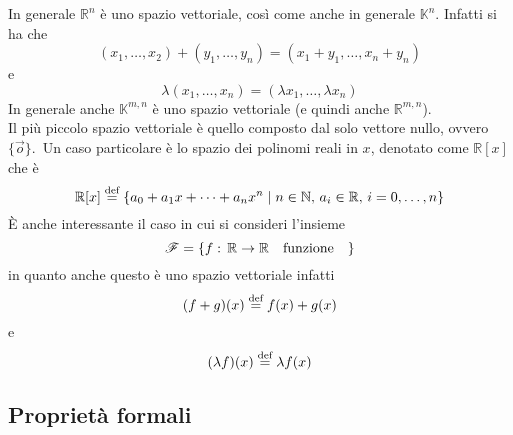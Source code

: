 In generale $\mathbb{R}^n$ è uno spazio vettoriale, così come anche in generale
$\mathbb{K}^n$. Infatti si ha che
\begin{equation*}
  (x_1,\ldots,x_2)+(y_1,\ldots,y_n) = (x_1+y_1,\ldots,x_n+y_n)
\end{equation*}
e
\begin{equation*}
  \lambda(x_1,\ldots,x_n) = (\lambda x_1,\ldots,\lambda x_n)
\end{equation*}
In generale anche $\mathbb{K}^{m,n}$ è uno spazio vettoriale (e quindi anche
$\mathbb{R}^{m,n}$).\\
Il più piccolo spazio vettoriale è quello composto dal solo vettore nullo, ovvero
$\{\vec{o}\}$.\
Un caso particolare è lo spazio dei polinomi reali in $x$, denotato come $\mathbb{R}[x]$
che è
\begin{equation*}
  \mathbb{R}[x]\bydef \left\{ a_0+a_1x+\cdots+a_n x^n\Setsuchthat
  n\in\mathbb{N},\,a_i\in\mathbb{R},\,i=0,\ldots,n \right\}
\end{equation*}
È anche interessante il caso in cui si consideri l'insieme
\begin{equation*}
  \mathscr{F} = \left\{ f:\,\mathbb{R}\to\mathbb{R}\qq{funzione} \right\}
\end{equation*}
in quanto anche questo è uno spazio vettoriale infatti
\begin{equation*}
  (f+g)(x)\overset{\text{def}}{=} f(x)+g(x)
\end{equation*}
e
\begin{equation*}
  (\lambda f)(x)\overset{\text{def}}{=} \lambda f(x)
\end{equation*}

\subsection{Proprietà formali}%
\label{sub:proprieta_formali}

